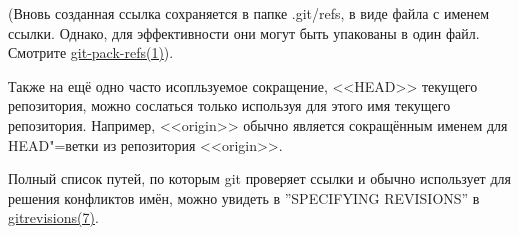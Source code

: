 \documentclass[a4paper, 12pt]{report}
\begin{document}
(Вновь созданная ссылка сохраняется в папке .git/refs, в виде файла с именем ссылки.
Однако, для эффективности они могут быть упакованы в один файл. Смотрите 
\href{http://www.kernel.org/pub/software/scm/git/docs/git-pack-refs.html}{git-pack-refs(1)}).

Также на ещё одно часто исопльзуемое сокращение, <<HEAD>> текущего репозитория, 
можно сослаться только используя для этого имя текущего репозитория. Например, 
<<origin>> обычно является сокращённым именем для HEAD"=ветки из репозитория <<origin>>.

Полный список путей, по которым git проверяет ссылки и обычно использует для
решения конфликтов имён, можно увидеть в ''SPECIFYING REVISIONS'' в 
\href{http://www.kernel.org/pub/software/scm/git/docs/gitrevisions.html}{gitrevisions(7)}.
%
%
\end{document}
